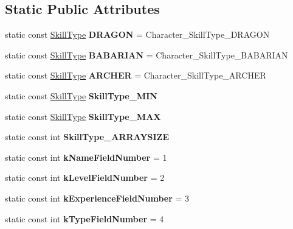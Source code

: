 \subsection*{Static Public Attributes}
\begin{DoxyCompactItemize}
\item 
\hypertarget{classproto_1_1_character_a2534316f551398caf36ffb70edd26c59}{}static const \hyperlink{class_skill_type}{Skill\+Type} {\bfseries D\+R\+A\+G\+O\+N} = Character\+\_\+\+Skill\+Type\+\_\+\+D\+R\+A\+G\+O\+N\label{classproto_1_1_character_a2534316f551398caf36ffb70edd26c59}

\item 
\hypertarget{classproto_1_1_character_af09643d45f3255fd1ba38290360d3f7c}{}static const \hyperlink{class_skill_type}{Skill\+Type} {\bfseries B\+A\+B\+A\+R\+I\+A\+N} = Character\+\_\+\+Skill\+Type\+\_\+\+B\+A\+B\+A\+R\+I\+A\+N\label{classproto_1_1_character_af09643d45f3255fd1ba38290360d3f7c}

\item 
\hypertarget{classproto_1_1_character_aa89a4c757856ea243b91ee4096ef6817}{}static const \hyperlink{class_skill_type}{Skill\+Type} {\bfseries A\+R\+C\+H\+E\+R} = Character\+\_\+\+Skill\+Type\+\_\+\+A\+R\+C\+H\+E\+R\label{classproto_1_1_character_aa89a4c757856ea243b91ee4096ef6817}

\item 
static const \hyperlink{class_skill_type}{Skill\+Type} {\bfseries Skill\+Type\+\_\+\+M\+I\+N}
\item 
static const \hyperlink{class_skill_type}{Skill\+Type} {\bfseries Skill\+Type\+\_\+\+M\+A\+X}
\item 
static const int {\bfseries Skill\+Type\+\_\+\+A\+R\+R\+A\+Y\+S\+I\+Z\+E}
\item 
\hypertarget{classproto_1_1_character_a21174aef26d652101417fa62e8dda531}{}static const int {\bfseries k\+Name\+Field\+Number} = 1\label{classproto_1_1_character_a21174aef26d652101417fa62e8dda531}

\item 
\hypertarget{classproto_1_1_character_aedf321e21616e4c5e72aea5133c6e6ed}{}static const int {\bfseries k\+Level\+Field\+Number} = 2\label{classproto_1_1_character_aedf321e21616e4c5e72aea5133c6e6ed}

\item 
\hypertarget{classproto_1_1_character_ab85f36070b1a5e36cf6f630ccd8776ed}{}static const int {\bfseries k\+Experience\+Field\+Number} = 3\label{classproto_1_1_character_ab85f36070b1a5e36cf6f630ccd8776ed}

\item 
\hypertarget{classproto_1_1_character_aa703f9a654ef42746351dea516e3d83b}{}static const int {\bfseries k\+Type\+Field\+Number} = 4\label{classproto_1_1_character_aa703f9a654ef42746351dea516e3d83b}

\end{DoxyCompactItemize}
